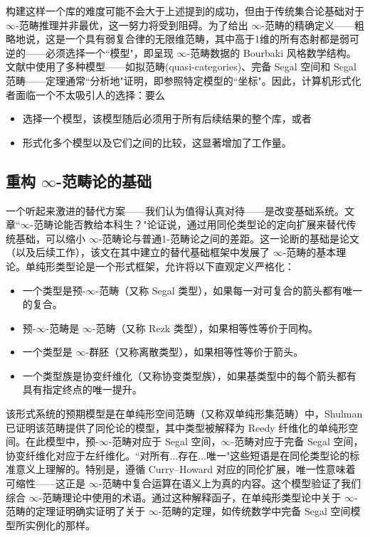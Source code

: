 \documentclass[12pt,a4paper]{article}
\theoremstyle{definition}
\theoremstyle{definition}
\begin{document}
构建这样一个库的难度可能不会大于上述提到的成功，但由于传统集合论基础对于 $\infty$-范畴推理并非最优，这一努力将受到阻碍。为了给出 $\infty$-范畴的精确定义——粗略地说，这是一个具有弱复合律的无限维范畴，其中高于1维的所有态射都是弱可逆的——必须选择一个``模型"，即呈现 $\infty$-范畴数据的 Bourbaki 风格数学结构。文献中使用了多种模型——如拟范畴(quasi-categories)、完备 Segal 空间和 Segal 范畴——定理通常``分析地"证明，即参照特定模型的``坐标"。因此，计算机形式化者面临一个不太吸引人的选择：要么
\begin{itemize}
    \item 选择一个模型，该模型随后必须用于所有后续结果的整个库，或者
    \item 形式化多个模型以及它们之间的比较，这显著增加了工作量。
\end{itemize}

\subsection{重构 $\infty$-范畴论的基础}

一个听起来激进的替代方案——我们认为值得认真对待——是改变基础系统。文章``$\infty$-范畴论能否教给本科生？"论证说，通过用同伦类型论的定向扩展来替代传统基础，可以缩小 $\infty$-范畴论与普通1-范畴论之间的差距。这一论断的基础是论文（以及后续工作），该文在其中建立的替代基础框架中发展了 $\infty$-范畴的基本理论。单纯形类型论是一个形式框架，允许将以下直观定义严格化：
\begin{itemize}
    \item 一个类型是预-$\infty$-范畴（又称 Segal 类型），如果每一对可复合的箭头都有唯一的复合。
    \item 预-$\infty$-范畴是 $\infty$-范畴（又称 Rezk 类型），如果相等性等价于同构。
    \item 一个类型是 $\infty$-群胚（又称离散类型），如果相等性等价于箭头。
    \item 一个类型族是协变纤维化（又称协变类型族），如果基类型中的每个箭头都有具有指定终点的唯一提升。
\end{itemize}

该形式系统的预期模型是在单纯形空间范畴（又称双单纯形集范畴）中，Shulman 已证明该范畴提供了同伦论的模型，其中类型被解释为 Reedy 纤维化的单纯形空间。在此模型中，预-$\infty$-范畴对应于 Segal 空间，$\infty$-范畴对应于完备 Segal 空间，协变纤维化对应于左纤维化。``对所有...存在...唯一"这些短语是在同伦类型论的标准意义上理解的。特别是，遵循 Curry--Howard 对应的同伦扩展，唯一性意味着可缩性——这正是 $\infty$-范畴中复合运算在语义上为真的内容。这个模型验证了我们综合 $\infty$-范畴理论中使用的术语。通过这种解释函子，在单纯形类型论中关于 $\infty$-范畴的定理证明确实证明了关于 $\infty$-范畴的定理，如传统数学中完备 Segal 空间模型所实例化的那样。
\end{document}
